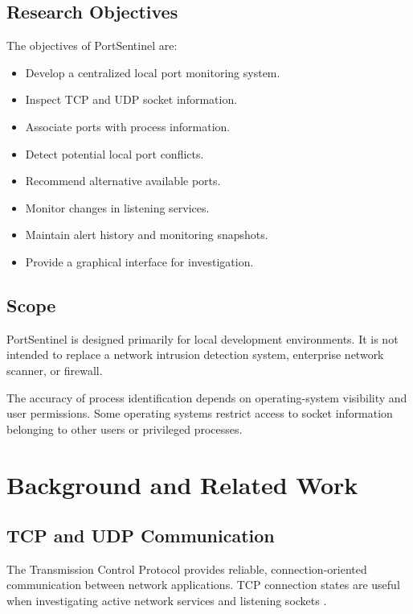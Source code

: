 \documentclass[conference]{IEEEtran}
\begin{document}
\subsection{Research Objectives}

The objectives of PortSentinel are:

\begin{itemize}
    \item Develop a centralized local port monitoring system.
    \item Inspect TCP and UDP socket information.
    \item Associate ports with process information.
    \item Detect potential local port conflicts.
    \item Recommend alternative available ports.
    \item Monitor changes in listening services.
    \item Maintain alert history and monitoring snapshots.
    \item Provide a graphical interface for investigation.
\end{itemize}

\subsection{Scope}

PortSentinel is designed primarily for local development
environments. It is not intended to replace a network
intrusion detection system, enterprise network scanner,
or firewall.

The accuracy of process identification depends on
operating-system visibility and user permissions.
Some operating systems restrict access to socket
information belonging to other users or privileged
processes.

\section{Background and Related Work}

\subsection{TCP and UDP Communication}

The Transmission Control Protocol provides reliable,
connection-oriented communication between network
applications. TCP connection states are useful when
investigating active network services and listening
sockets \cite{tcp,rfc9293}.
\end{document}
